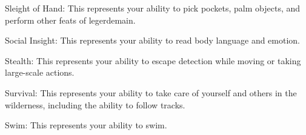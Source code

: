 \begin{raggeditemize}
    \item Sleight of Hand: This represents your ability to pick pockets, palm objects, and perform other feats of legerdemain.
    \item Social Insight: This represents your ability to read body language and emotion.
    \item Stealth: This represents your ability to escape detection while moving or taking large-scale actions.
    \item Survival: This represents your ability to take care of yourself and others in the wilderness, including the ability to follow tracks.
    \item Swim: This represents your ability to swim.
  \end{raggeditemize}
